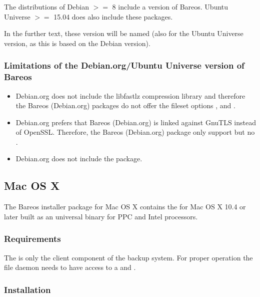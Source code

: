 The distributions of Debian $>=$ 8 include a version of Bareos.
Ubuntu Universe $>=$ 15.04 does also include these packages. 

In the further text, these version will be named  
(also for the Ubuntu Universe version, as this is based on the Debian version).

\subsubsection{Limitations of the Debian.org/Ubuntu Universe version of Bareos}
\label{sec:DebianOrgLimitations}

    \begin{itemize}
        \item Debian.org does not include the libfastlz compression library and therefore the Bareos (Debian.org) packages do not offer the fileset options ,  and .
        \item Debian.org prefers that Bareos (Debian.org) is linked against GnuTLS instead of OpenSSL. Therefore, the Bareos (Debian.org) package only support  but no .
        \item Debian.org does not include the  package.
    \end{itemize}


\subsection{Mac OS X}
\label{sec:macosx}

The Bareos installer package for Mac OS X contains the \bareosFd for Mac OS X 10.4 or later built as an universal binary for PPC and Intel processors.

\subsubsection{Requirements}

The \bareosFd is only the client component of the backup system. For proper operation the file daemon needs to have access to a \bareosDir and \bareosSd.

\subsubsection{Installation}

